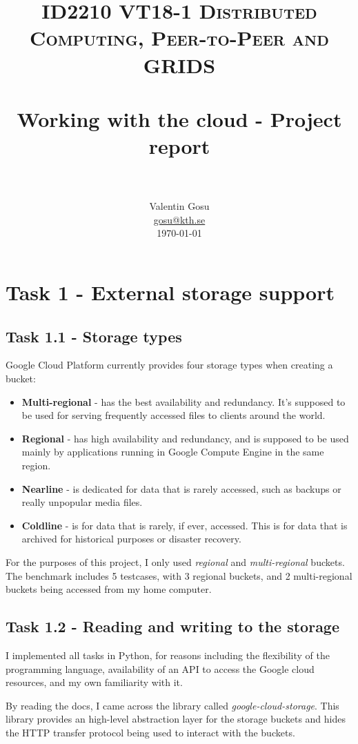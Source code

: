 \documentclass[paper=a4, fontsize=11pt]{scrartcl}
\title{
    \usefont{OT1}{bch}{b}{n}
    \normalfont \normalsize \textsc{ID2210 VT18-1 Distributed Computing, Peer-to-Peer and GRIDS} \\ [25pt]
    \horrule{0.5pt} \\[0.4cm]
    \huge Working with the cloud - Project report \\
    \horrule{2pt} \\[0.5cm]
}
\author{
    \normalfont                 \normalsize
        Valentin Gosu\\[-3pt]   \normalsize
        \href{mailto:gosu@kth.se}{gosu@kth.se} \\[-3pt]   \normalsize
        \today
}
\date{}
\numberwithin{equation}{section}    %
\numberwithin{figure}{section}      %
\numberwithin{table}{section}       %
\begin{document}
\maketitle
\section{Task 1 - External storage support}
\subsection{Task 1.1 - Storage types}


Google Cloud Platform currently provides four storage types when creating a bucket:
\begin{itemize}
  \item \textbf{Multi-regional} - has the best availability and redundancy. It's supposed to be used for serving frequently accessed files to clients around the world.
  \item \textbf{Regional} - has high availability and redundancy, and is supposed to be used mainly by applications running in Google Compute Engine in the same  region.
    \item \textbf{Nearline} - is dedicated for data that is rarely accessed, such as backups or really unpopular media files.
    \item \textbf{Coldline} - is for data that is rarely, if ever, accessed. This is for data that is archived for historical purposes or disaster recovery.
\end{itemize}

For the purposes of this project, I only used \textit{regional} and \textit{multi-regional} buckets. The benchmark includes 5 testcases, with 3 regional buckets, and 2 multi-regional buckets being accessed from my home computer.

\subsection{Task 1.2 - Reading and writing to the storage}

I implemented all tasks in Python, for reasons including the flexibility of the programming language, availability of an API to access the Google cloud resources, and my own familiarity with it.

By reading the docs, I came across the library called \textit{google-cloud-storage}. This library provides an high-level abstraction layer for the storage buckets and hides the HTTP transfer protocol being used to interact with the buckets.
\end{document}
